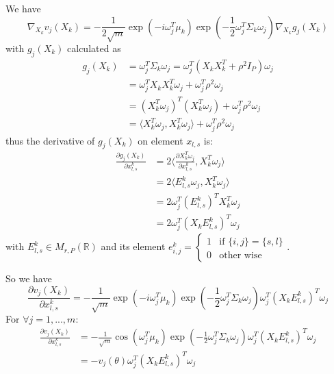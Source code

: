 \documentclass[12pt,a4paper]{article}
\begin{document}
\begin{itemize}
\begin{itemize}
We have
\begin{equation}
    \nabla_{X_k} v_j(X_k) = - \frac{1}{2\sqrt{m}}  \exp(-i\omega_j^T\mu_k)  \exp(-\frac{1}{2}\omega_j^T \Sigma_k \omega_j)\nabla_{X_k} g_j(X_k)
\end{equation}
with $g_j(X_k)$ calculated as
\begin{equation}
    \begin{aligned}
    g_j(X_k) &= \omega_j^T \Sigma_k \omega_j = \omega_j^T (X_k X_k^T + \rho^2 I_P)\omega_j \\&= \omega_j^T X_k X_k^T \omega_j + \omega_j ^T \rho^2 \omega_j
    \\&= (X_k^T \omega_j)^T(X_k^T \omega_j)+ \omega_j ^T \rho^2 \omega_j \\& = \langle X_k^T \omega_j, X_k^T \omega_j \rangle + \omega_j ^T \rho^2 \omega_j
\end{aligned}
\end{equation}
thus the derivative of $g_j(X_k)$ on element $x_{l,s}$ is:
\begin{equation}
    \begin{aligned}
    \frac{\partial g_j(X_k)}{\partial x_{l,s}^k} &= 2 \langle \frac{\partial X_k^T \omega_j}{\partial x_{l,s}^k}   ,X_k^T \omega_j \rangle \\&= 2 \langle E_{l,s}^k \omega_j ,X_k^T \omega_j \rangle \\&= 2\omega_j ^T (E_{l,s}^k)^T X_k^T \omega_j\\&= 2\omega_j ^T (X_k E_{l,s}^k)^T \omega_j
\end{aligned}
\end{equation}
with $E_{l,s}^k \in M_{r, P}(\mathbb{R}) $ and its element $e_{i,j}^k = \begin{cases} 1 & \mbox{if } \{i, j\} = \{s, l\} \\ 0 & \mbox{other wise}  \end{cases}$. 

So we have 
\begin{equation}
    \frac{\partial v_j(X_k)}{\partial x_{l,s}^k} = - \frac{1}{\sqrt{m}}  \exp(-i\omega_j^T\mu_k)  \exp(-\frac{1}{2}\omega_j^T \Sigma_k \omega_j)\omega_j ^T (X_k E_{l,s}^k)^T  \omega_j
\end{equation}
For $\forall j = 1,...,m$:
\begin{equation}
\begin{aligned}
        \frac{\partial v_j(X_k)}{\partial x_{l,s}^k} &= - \frac{1}{\sqrt{m}}  \cos(\omega_j^T\mu_k)  \exp(-\frac{1}{2}\omega_j^T \Sigma_k \omega_j)\omega_j ^T (X_k E_{l,s}^k)^T  \omega_j
        \\&= - v_j(\theta)\omega_j ^T (X_k E_{l,s}^k)^T  \omega_j
\end{aligned}
\end{equation}


\end{itemize}
\end{itemize}
\end{document}
